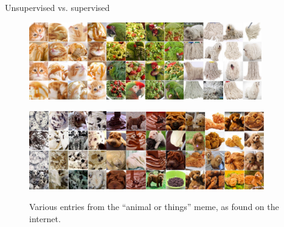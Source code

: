 \documentclass[xcolor=x11names,compress]{beamer}
\renewcommand{\(}{\begin{columns}}
\renewcommand{\)}{\end{columns}}
\newcommand{\<}[1]{\begin{column}{#1}}
\renewcommand{\>}{\end{column}}
\begin{document}

\begin{frame}{Unsupervised vs. supervised}

\begin{figure}
  \includegraphics[width=0.3\textwidth]{ice_cream_2}\includegraphics[width=0.3\textwidth]{guacamole}\includegraphics[width=0.3\textwidth]{sheep}
  
  \includegraphics[width=0.3\textwidth]{ice_cream}\includegraphics[width=0.305\textwidth]{chocolate}\includegraphics[width=0.305\textwidth]{fried_chicken}
  \caption{Various entries from the ``animal or things'' meme, as found on the
  internet.}
\end{figure}


\end{frame}
\end{document}
